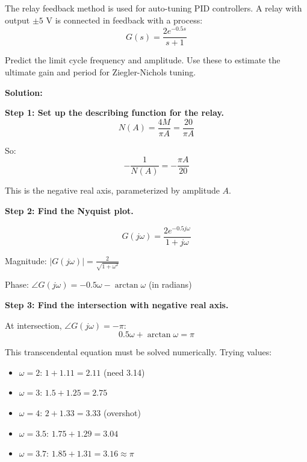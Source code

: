 \begin{example}
\label{ex:relay_autotuning}
The relay feedback method is used for auto-tuning PID controllers. A relay with output $\pm 5$ V is connected in feedback with a process:
\begin{equation}
G(s) = \frac{2e^{-0.5s}}{s+1}
\end{equation}

Predict the limit cycle frequency and amplitude. Use these to estimate the ultimate gain and period for Ziegler-Nichols tuning.

\textbf{Solution:}

\textbf{Step 1: Set up the describing function for the relay.}
\begin{equation}
N(A) = \frac{4M}{\pi A} = \frac{20}{\pi A}
\end{equation}

So:
\begin{equation}
-\frac{1}{N(A)} = -\frac{\pi A}{20}
\end{equation}

This is the negative real axis, parameterized by amplitude $A$.

\textbf{Step 2: Find the Nyquist plot.}

\begin{equation}
G(j\omega) = \frac{2e^{-0.5j\omega}}{1+j\omega}
\end{equation}

Magnitude: $|G(j\omega)| = \frac{2}{\sqrt{1+\omega^2}}$

Phase: $\angle G(j\omega) = -0.5\omega - \arctan\omega$ (in radians)

\textbf{Step 3: Find the intersection with negative real axis.}

At intersection, $\angle G(j\omega) = -\pi$:
\begin{equation}
0.5\omega + \arctan\omega = \pi
\end{equation}

This transcendental equation must be solved numerically. Trying values:
\begin{itemize}
    \item $\omega = 2$: $1 + 1.11 = 2.11$ (need 3.14)
    \item $\omega = 3$: $1.5 + 1.25 = 2.75$
    \item $\omega = 4$: $2 + 1.33 = 3.33$ (overshot)
    \item $\omega = 3.5$: $1.75 + 1.29 = 3.04$
    \item $\omega = 3.7$: $1.85 + 1.31 = 3.16 \approx \pi$
\end{itemize}


\end{example}
